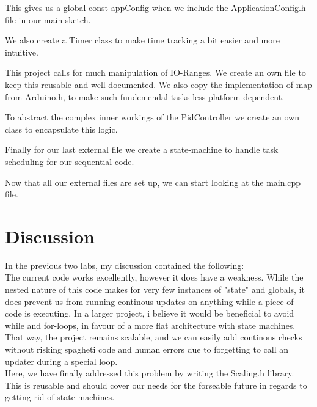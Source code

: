 \documentclass[journal]{IEEEtran}
\begin{document}


\onecolumn


This gives us a global const appConfig when we include the ApplicationConfig.h file
in our main sketch.

\vfill\null
\pagebreak


We also create a Timer class to make time tracking a bit easier and more intuitive.

\vfill\null
\pagebreak


This project calls for much manipulation of IO-Ranges. We create an own
file to keep this reusable and well-documented. We also copy the implementation
of map\(\) from Arduino.h, to make such fundemendal tasks less platform-dependent.

\vfill\null
\pagebreak


To abstract the complex inner workings of the PidController we
create an own class to encapsulate this logic.

\vfill\null
\pagebreak

Finally for our last external file we create a state-machine to
handle task scheduling for our sequential code.


\vfill\null
\pagebreak

Now that all our external files are set up, we can start looking at the main.cpp file.


\vfill\null
\pagebreak

\section{Discussion}
In the previous two labs, my discussion contained the following:\\

The current code works excellently, however it does have a weakness.
While the nested nature of this code makes for very few instances of "state" and
globals, it does prevent us from running continous updates on anything while
a piece of code is executing. In a larger project, i believe it would be
beneficial to avoid while and for-loops, in favour of a more flat architecture with
state machines. That way, the project remains scalable, and we can easily add
continous checks without risking spagheti code and human errors due to forgetting
to call an updater during a special loop.\\

Here, we have finally addressed this problem by writing
the Scaling.h library. This is reusable and should cover our needs
for the forseable future in regards to getting rid of state-machines.
\end{document}
